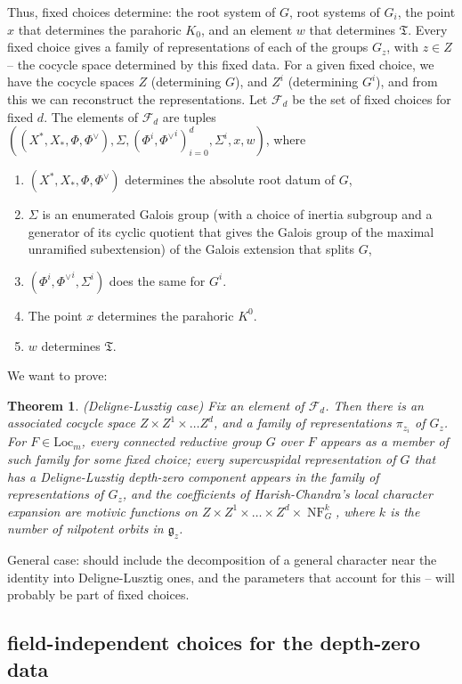 \documentclass[12pt]{amsart}
\newcommand{\cF}{\mathcal{F}}
\newcommand{\fg}{\mathfrak{g}}
\newcommand{\Loc}{\mathrm{Loc}}
\def\cF{\mathcal{F}}
\newcommand{\op}[1]{\operatorname{#1}}
\newcommand{\NF}{\op{NF}}
\newcommand{\fT}{\mathfrak T}
\theoremstyle{plain}
\newtheorem{theorem}[thm]{Theorem}
\theoremstyle{definition}
\begin{document}
Thus, fixed choices determine: the root system of $G$, root systems of $G_i$, 
the point $x$ that determines the parahoric $K_0$, and an element $w$ that determines 
$\fT$.  
Every fixed choice gives a family of representations of each of the groups $G_z$, with $z\in Z$ -- the cocycle space determined by this fixed data.
For a given fixed choice, we have the cocycle spaces $Z$ (determining $G$), and $Z^i$ (determining $G^i$), and from this we can reconstruct the representations. 
Let $\cF_d$ be the set of fixed choices for fixed $d$.
The elements of $\cF_d$ are tuples 
$\left((X^\ast, X_\ast, \Phi, \Phi^\vee), \Sigma, (\Phi^i, {\Phi^\vee}^i)_{i=0}^d, \Sigma^i, x, w\right)$, where 
\begin{enumerate}
\item  $(X^\ast, X_\ast, \Phi, \Phi^\vee)$  determines the absolute root datum of $G$, 
\item $\Sigma$ is an enumerated Galois group (with a choice of inertia subgroup and a 
generator of its cyclic quotient that gives the Galois group of the maximal unramified 
subextension) of the Galois extension that splits $G$,
\item  $(\Phi^i, {\Phi^\vee}^i, \Sigma^i)$ does the same for $G^i$. 
\item  The point $x$  determines the parahoric $K^0$.   
\item $w$ determines  $\fT$. 
\end{enumerate}

We want to prove: 
\begin{theorem} (Deligne-Lusztig case) Fix an element of $\cF_d$. 
Then there is an associated cocycle space $Z\times Z^1\times \dots Z^d$, and a family of representations $\pi_{z_i}$ of $G_z$. 
For $F\in \Loc_m$, every connected reductive group $G$ over $F$ appears as a member  of such  family for some fixed choice; 
every supercuspidal representation of $G$ that has a Deligne-Luzstig depth-zero component 
appears in the family of representations of $G_z$, and 
the coefficients of Harish-Chandra's local character expansion are motivic functions on 
$Z\times Z^1\times \dots \times Z^d\times \NF_G^k$, where $k$ is the number of nilpotent orbits in $\fg_z$. 
\end{theorem}

General case: should include the decomposition of a general character near the identity into Deligne-Lusztig ones, and the parameters that account for this -- will probably be part of fixed choices. 

\subsection{field-independent choices for the depth-zero data}
\end{document}
